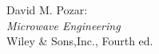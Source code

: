 \clearpage
\begin{thebibliography}{9}
 David M. Pozar:\\ \emph{Microwave Engineering}\\ Wiley \& Sons,Inc., Fourth ed.
\end{thebibliography}